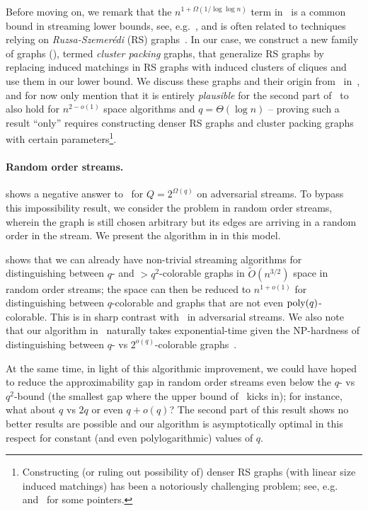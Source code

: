 \documentclass[11pt]{article}
\theoremstyle{definition}
\newcommand{\rs}{{{Ruzsa-Szemerédi}}\xspace}
\newcommand{\Ot}{\ensuremath{\widetilde{O}}}
\newcommand{\poly}{\mbox{\rm poly}}
\begin{document}
Before moving on, we remark that the $n^{1+\Omega(1/\log\log{n})}$ term in~ is a common bound in streaming lower bounds, see, e.g.~\cite{GoelKK12,Kapralov13,AssadiKL17,CormodeDK19,Kapralov21,KonradT25},
and is often related to techniques relying on \emph{\rs} (RS) graphs~\cite{RuzsaS78}. In our case, we construct a new family of graphs (), termed \emph{cluster packing} graphs, that generalize RS graphs by replacing induced matchings in RS graphs with induced clusters of cliques and use them in our lower bound. We discuss these graphs and their origin from~\cite{AssadiKNS24} in~,
and for now only mention that it is entirely \emph{plausible} for the second part of~ to also hold for $n^{2-o(1)}$ space algorithms and $q = \Theta(\log{n})$ -- proving such a result ``only'' requires constructing denser RS graphs and cluster 
packing graphs with certain parameters\footnote{Constructing (or ruling out possibility of) denser RS graphs (with linear size induced matchings) has been a notoriously challenging problem; see, e.g.~\cite{FoxHS17,AssadiS23} 
and~ for some pointers.}.

\paragraph{Random order streams.}  shows a negative answer to~ for $Q = 2^{\Omega(q)}$ on adversarial streams. 
To bypass this impossibility result, we consider the problem in random order streams, wherein the graph is still chosen arbitrary but its edges are arriving in a random order in the stream. 
We present the algorithm in  in this model. 

 shows that we can already have non-trivial streaming algorithms for distinguishing between $q$- and $>\!\!q^2$-colorable graphs in $\Ot(n^{3/2})$ space in random order streams;
the space can then be reduced to $n^{1+o(1)}$ for distinguishing between $q$-colorable and graphs that are not even $\poly(q)$-colorable. This is in sharp contrast with~ in adversarial streams. 
We also note that our algorithm in~ naturally takes exponential-time given the NP-hardness of distinguishing between $q$- vs $2^{o(q)}$-colorable graphs~\cite{KrokhinOWZ23}. 

At the same time, in light of this algorithmic improvement, we could have hoped to reduce the approximability gap in random order streams even below the $q$- vs $q^2$-bound (the smallest gap where the upper bound of~ kicks in); 
for instance, what about $q$ vs $2q$ or even $q+o(q)$? The second part of this result shows no better results are possible and our algorithm is asymptotically optimal in this respect for constant (and even polylogarithmic) values of $q$. 
\end{document}
